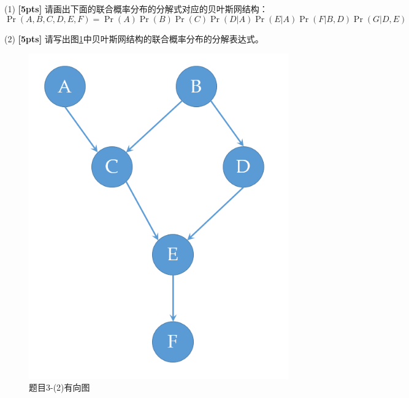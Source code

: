 \documentclass[a4paper,UTF8]{article}
\numberwithin{equation}{section}
\theoremstyle{definition}
\begin{document}
(1) \textbf{[5pts]} 请画出下面的联合概率分布的分解式对应的贝叶斯网结构：
\begin{equation*}
\Pr(A, B, C, D, E, F) = \Pr(A)\Pr(B)\Pr(C)\Pr(D|A)\Pr(E|A)\Pr(F|B, D)\Pr(G|D, E)
\end{equation*}

(2) \textbf{[5pts]} 请写出图\ref{fig-DAG}中贝叶斯网结构的联合概率分布的分解表达式。
\begin{figure}[h]
\label{fig-DAG}
\centering
\includegraphics[scale=0.3]{bayes_net.png}
\caption{题目3-(2)有向图}
\end{figure}
\end{document}
